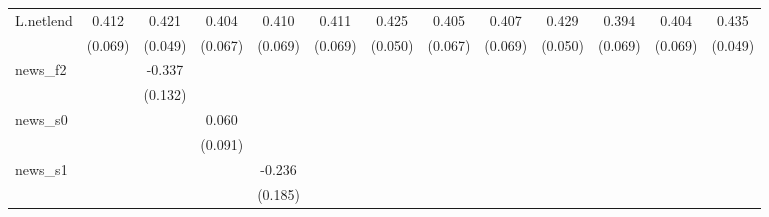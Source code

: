 {\begin{tabular}{l*{12}{c}}
\addlinespace
L.netlend   &       0.412\sym{***}&       0.421\sym{***}&       0.404\sym{***}&       0.410\sym{***}&       0.411\sym{***}&       0.425\sym{***}&       0.405\sym{***}&       0.407\sym{***}&       0.429\sym{***}&       0.394\sym{***}&       0.404\sym{***}&       0.435\sym{***}\\
            &     (0.069)         &     (0.049)         &     (0.067)         &     (0.069)         &     (0.069)         &     (0.050)         &     (0.067)         &     (0.069)         &     (0.050)         &     (0.069)         &     (0.069)         &     (0.049)         \\
\addlinespace
news\_f2     &                     &      -0.337\sym{**} &                     &                     &                     &                     &                     &                     &                     &                     &                     &                     \\
            &                     &     (0.132)         &                     &                     &                     &                     &                     &                     &                     &                     &                     &                     \\
\addlinespace
news\_s0     &                     &                     &       0.060         &                     &                     &                     &                     &                     &                     &                     &                     &                     \\
            &                     &                     &     (0.091)         &                     &                     &                     &                     &                     &                     &                     &                     &                     \\
\addlinespace
news\_s1     &                     &                     &                     &      -0.236         &                     &                     &                     &                     &                     &                     &                     &                     \\
            &                     &                     &                     &     (0.185)         &                     &                     &                     &                     &                     &                     &                     &                     \\

\end{tabular}}

